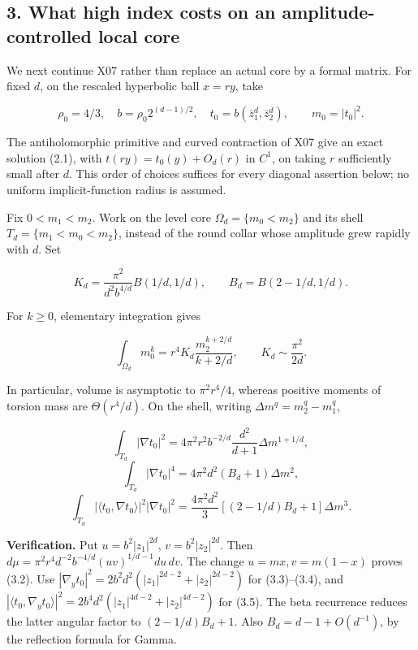 \documentclass[
  11pt,
]{article}
\begin{document}
\hypertarget{what-high-index-costs-on-an-amplitude-controlled-local-core}{%
\subsection{3. What high index costs on an amplitude-controlled local
core}\label{what-high-index-costs-on-an-amplitude-controlled-local-core}}

We next continue X07 rather than replace an actual core by a formal
matrix. For fixed \(d\), on the rescaled hyperbolic ball \(x=ry\), take

\[
 \rho_0=4/3,\quad b=\rho_0 2^{(d-1)/2},\quad
 t_0=b(\bar z_1^d,\bar z_2^d),\qquad
 m_0=|t_0|^2.
 \tag{3.1}
\]

The antiholomorphic primitive and curved contraction of X07 give an
exact solution (2.1), with \(t(ry)=t_0(y)+O_d(r)\) in \(C^1\), on taking
\(r\) sufficiently small after \(d\). This order of choices suffices for
every diagonal assertion below; no uniform implicit-function radius is
assumed.

Fix \(0<m_1<m_2\). Work on the level core \(\Omega_d=\{m_0<m_2\}\) and
its shell \(T_d=\{m_1<m_0<m_2\}\), instead of the round collar whose
amplitude grew rapidly with \(d\). Set

\[
 K_d=\frac{\pi^2}{d^2b^{4/d}}B(1/d,1/d),\qquad
 B_d=B(2-1/d,1/d).
\]

For \(k\ge0\), elementary integration gives

\[
 \int_{\Omega_d}m_0^k
 =r^4K_d\frac{m_2^{k+2/d}}{k+2/d},\qquad
 K_d\sim\frac{\pi^2}{2d}.
 \tag{3.2}
\]

In particular, volume is asymptotic to \(\pi^2r^4/4\), whereas positive
moments of torsion mass are \(\Theta(r^4/d)\). On the shell, writing
\(\Delta m^q=m_2^q-m_1^q\),

\[
 \int_{T_d}|\nabla t_0|^2
 =4\pi^2r^2b^{-2/d}\frac{d^2}{d+1}\Delta m^{1+1/d},
 \tag{3.3}
\] \[
 \int_{T_d}|\nabla t_0|^4
 =4\pi^2d^2(B_d+1)\Delta m^2,
 \tag{3.4}
\] \[
 \int_{T_d}|\langle t_0,\nabla t_0\rangle|^2|\nabla t_0|^2
 =\frac{4\pi^2d^2}{3}
       [(2-1/d)B_d+1]\Delta m^3.
 \tag{3.5}
\]

\textbf{Verification.} Put \(u=b^2|z_1|^{2d}\), \(v=b^2|z_2|^{2d}\).
Then \(d\mu=\pi^2r^4d^{-2}b^{-4/d}(uv)^{1/d-1}du\,dv\). The change
\(u=mx,v=m(1-x)\) proves (3.2). Use
\(|\nabla_y t_0|^2=2b^2d^2(|z_1|^{2d-2}+|z_2|^{2d-2})\) for
(3.3)--(3.4), and
\(|\langle t_0,\nabla_y t_0\rangle|^2 =2b^4d^2(|z_1|^{4d-2}+|z_2|^{4d-2})\)
for (3.5). The beta recurrence reduces the latter angular factor to
\((2-1/d)B_d+1\). Also \(B_d=d-1+O(d^{-1})\), by the reflection formula
for Gamma.
\end{document}
